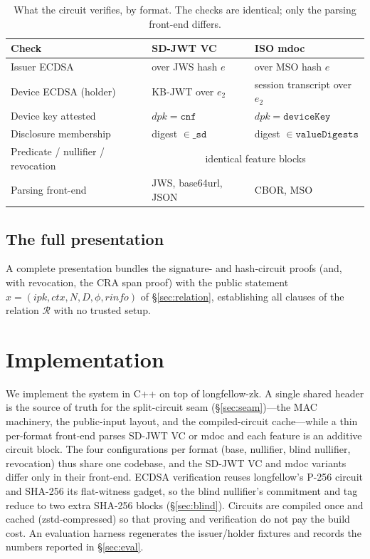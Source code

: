 \documentclass[11pt]{article}
\theoremstyle{plain}
\theoremstyle{definition}
\begin{document}
\begin{table}[t]\centering\small
\caption{What the circuit verifies, by format. The checks are identical; only the
parsing front-end differs.}
\label{tab:checks}
\begin{tabular}{@{}lll@{}}
\toprule
Check & SD-JWT VC & ISO mdoc \\
\midrule
Issuer ECDSA              & over JWS hash $e$              & over MSO hash $e$ \\
Device ECDSA (holder)     & KB-JWT over $e_2$             & session transcript over $e_2$ \\
Device key attested       & $\mathit{dpk}=\mathtt{cnf}$   & $\mathit{dpk}=\mathtt{deviceKey}$ \\
Disclosure membership     & digest $\in\mathtt{\_sd}$     & digest $\in\mathtt{valueDigests}$ \\
Predicate / nullifier / revocation & \multicolumn{2}{c}{identical feature blocks} \\
\midrule
Parsing front-end         & JWS, base64url, JSON          & CBOR, MSO \\
\bottomrule
\end{tabular}
\end{table}

\subsection{The full presentation}
A complete presentation bundles the signature- and hash-circuit proofs (and, with
revocation, the CRA span proof) with the public statement
$x=(\mathit{ipk},\mathit{ctx},N,D,\phi,\mathit{rinfo})$ of \S\ref{sec:relation},
establishing all clauses of the relation $\mathcal{R}$ with no trusted setup.

\section{Implementation}\label{sec:impl}
We implement the system in C++ on top of longfellow-zk. A single shared header is the
source of truth for the split-circuit seam (\S\ref{sec:seam})---the MAC machinery, the
public-input layout, and the compiled-circuit cache---while a thin per-format front-end
parses SD-JWT VC or mdoc and each feature is an additive circuit block. The four
configurations per format (base, nullifier, blind nullifier, revocation) thus share one
codebase, and the SD-JWT VC and mdoc variants differ only in their front-end. ECDSA
verification reuses longfellow's P-256 circuit and SHA-256 its flat-witness gadget, so
the blind nullifier's commitment and tag reduce to two extra SHA-256 blocks
(\S\ref{sec:blind}). Circuits are compiled once and cached (zstd-compressed) so that
proving and verification do not pay the build cost. An evaluation harness regenerates
the issuer/holder fixtures and records the numbers reported in \S\ref{sec:eval}.
\end{document}
